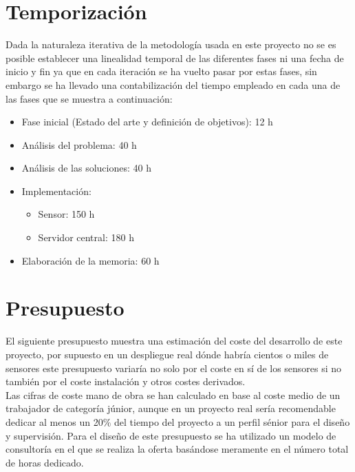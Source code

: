 \documentclass[../proyecto.tex]{subfiles}
\begin{document}
\section{Temporización}

Dada la naturaleza iterativa de la metodología usada en este proyecto no se es posible establecer una linealidad  temporal de las diferentes fases ni una fecha de inicio y fin ya que en cada iteración se ha vuelto pasar por estas fases, sin embargo se ha llevado una contabilización del tiempo empleado en cada una de las fases que se muestra a continuación:\\

\begin{itemize}
  \item Fase inicial (Estado del arte y definición de objetivos): 12 h
  \item Análisis del problema: 40 h
  \item Análisis de las soluciones: 40 h
  \item Implementación:
  \begin{itemize}
    \item Sensor: 150 h
    \item Servidor central: 180 h
  \end{itemize}
  \item Elaboración de la memoria: 60 h
\end{itemize}


\section{Presupuesto}

El siguiente presupuesto muestra una estimación del coste del desarrollo de este proyecto, por supuesto en un despliegue real dónde habría cientos o miles de sensores este presupuesto variaría no solo por el coste en sí de los sensores si no también por el coste instalación y otros costes derivados.\\

Las cifras de coste mano de obra se han calculado en base al coste medio de un trabajador de categoría júnior, aunque en un proyecto real sería recomendable dedicar al menos un 20\% del tiempo del proyecto a un perfil sénior para el diseño y supervisión. Para el diseño de este presupuesto se ha utilizado un modelo de consultoría en el que se realiza la oferta basándose meramente en el número total de horas dedicado.\\
\end{document}
